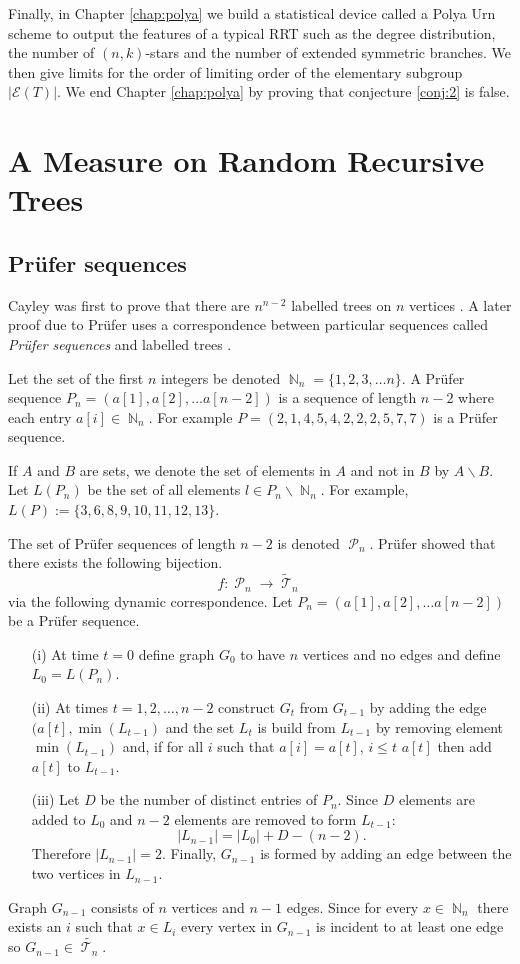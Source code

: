 \documentclass[oneside]{book} %
\theoremstyle{definition}
\numberwithin{equation}{section}
\DeclareMathOperator{\T}{\mathcal{T}}
\DeclareMathOperator{\N}{\mathbb{N}}
\DeclareMathOperator{\Pruf}{\mathcal{P}} %
\begin{document}
Finally, in Chapter \ref{chap:polya} we build a statistical device called a Polya Urn scheme to output the features of a typical 
RRT such as the degree distribution, the number of $(n,k)$-stars and the number of extended symmetric branches.  We then give limits
 for the order of limiting order of the elementary subgroup $\lvert \mathcal{E}(T) \rvert$.  We end Chapter \ref{chap:polya}  by 
 proving that conjecture \ref{conj:2} is false. 

\chapter{A Measure on Random Recursive Trees}

\section{Pr\"{ufer} sequences}\label{sec:Prufer}

Cayley was first to prove that there are $n^{n-2}$ labelled trees on $n$ vertices \cite{Cayley}. A later proof due 
to Pr\"{u}fer uses a correspondence between particular sequences called \emph{Pr\"{u}fer sequences} and labelled trees 
\cite{Bela}.  

Let the set of the first $n$ integers be denoted $\N_n = \{1,2,3,\dots n\}$.  A Pr\"{u}fer sequence $P_n = (a[1],a[2],\dots a[n-2])$
is a sequence of length $n-2$ where each entry $a[i]\in \N_n$. For example $P = (2,1,4,5,4,2,2,2,5,7,7)$ is a Pr\"{u}fer sequence. 

If $A$ and $B$ are sets, we denote the set of elements in $A$ and not in $B$ by $A \backslash B$. Let $L(P_n)$ be the set of all elements $l \in P_n \backslash \N_n$.  For example, $L(P) := \{3,6,8,9,10,11,12,13\}$.

The set of Pr\"{u}fer sequences of length $n-2$ is denoted $\Pruf_n$.  Pr\"{u}fer showed that there exists the following bijection. 
\[
  f: \Pruf_n \rightarrow\tilde{\T}_n 
\]
via the following dynamic correspondence.  Let $P_n = (a[1],a[2],\dots a[n-2])$ be a Pr\"{u}fer sequence.
\begin{itemize}
 \item[(i)] At time $t=0$ define graph $G_0$ to have $n$  vertices and no edges and  define $L_0 = L(P_n)$. 
 \item[(ii)] At times $t=1,2,\dots, n-2$ construct $G_t$ from $G_{t-1}$  by adding the edge $(a[t],\min(L_{t-1})$ and the set $L_t$
 is build from $L_{t-1}$ by removing element $\min(L_{t-1})$ and, if for all $i$ such that $a[i] = a[t]$, $i \leq t$ $a[t]$ then add $a[t]$ to $L_{t-1}$.
 \item[(iii)]Let $D$ be the number of distinct entries of $P_{n}$. Since $D$ elements are added to $L_{0}$ and $n-2$ elements are removed
to form $L_{t-1}$:
\[|L_{n-1}| = |L_{0}| + D - (n-2).\]
Therefore $|L_{n-1}| = 2$. Finally, $G_{n-1}$ is formed by adding an edge between the two vertices in $ 
L_{n-1}$.
\end{itemize}
Graph $G_{n-1}$ consists of $n$ vertices and $n-1$ edges.  Since for every $x \in \N_{n}$ there exists an $i$ such that $x \in L_i$ every vertex in $G_{n-1}$ is incident to at least one edge so $G_{n-1} \in \tilde{\T_n}$.  
\end{document}
